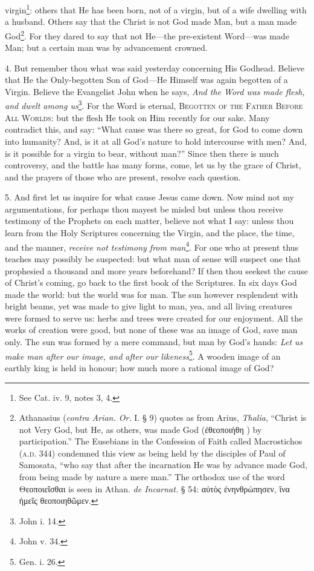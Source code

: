 virgin\footnote{See Cat. iv. 9, notes 3, 4.}: others that He has been born, not of a virgin, but of a wife dwelling with a husband. Others say that the Christ is not God made Man, but a man made God\footnote{Athanasius (\emph{contra Arian. Or.} I. § 9) quotes as from Arius, \emph{Thalia}, “Christ is not Very God, but He, as others, was made God (\textgreek{ἐθεοποιήθη} ) by participation.” The Eusebians in the Confession of Faith called Macrostichos (\textsc{a.d.} 344) condemned this view as being held by the disciples of Paul of Samosata, “who say that after the incarnation He was by advance made God, from being made by nature a mere man.” The orthodox use of the word \textgreek{Θεοποιεῖσθαι} is seen in Athan. \emph{de Incarnat.} § 54: \textgreek{αὐτὸς ἐνηνθρώπησεν, ἵνα ἡμεῖς θεοποιηθῶμεν}.}. For they dared to say that not He—the pre-existent Word—was made Man; but a certain man was by advancement crowned.

4. But remember thou what was said yesterday concerning His Godhead. Believe that He the Only-begotten Son of God—He Himself was again begotten of a Virgin. Believe the Evangelist John when he says, \emph{And the Word was made flesh, and dwelt among us}\footnote{John i. 14.}. For the Word is eternal, \textsc{Begotten of the Father Before All Worlds}: but the flesh He took on Him recently for our sake. Many contradict this, and say: “What cause was there so great, for God to come down into humanity? And, is it at all God’s nature to hold intercourse with men? And, is it possible for a virgin to bear, without man?” Since then there is much controversy, and the battle has many forms, come, let us by the grace of Christ, and the prayers of those who are present, resolve each question.

5. And first let us inquire for what cause Jesus came down. Now mind not my argumentations, for perhaps thou mayest be misled but unless thou receive testimony of the Prophets on each matter, believe not what I say: unless thou learn from the Holy Scriptures concerning the Virgin, and the place, the time, and the manner, \emph{receive not testimony from man}\footnote{John v. 34.}. For one who at present thus teaches may possibly be suspected: but what man of sense will suspect one that prophesied a thousand and more years beforehand? If then thou seekest the cause of Christ’s coming, go back to the first book of the Scriptures. In six days God made the world: but the world was for man. The sun however resplendent with bright beams, yet was made to give light to man, yea, and all living creatures were formed to serve us: herbs and trees were created for our enjoyment. All the works of creation were good, but none of these was an image of God, save man only. The sun was formed by a mere command, but man by God’s hands: \emph{Let us make man after our image, and after our likeness}\footnote{Gen. i. 26.}. A wooden image of an earthly king is held in honour; how much more a rational image of God?

